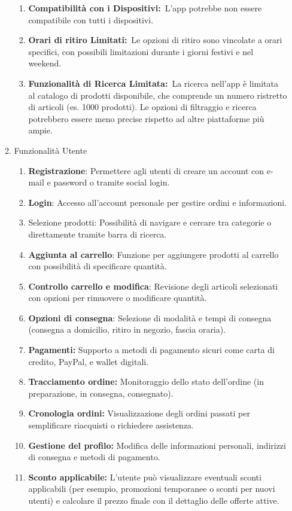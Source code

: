 \documentclass[a4paper,12pt]{article}
\begin{document}
\begin{enumerate}
\begin{enumerate}
\begin{enumerate}
   \item \textbf{Compatibilità con i Dispositivi:} L'app potrebbe non essere compatibile con tutti i dispositivi. 
   
   \item \textbf{Orari di ritiro Limitati:} Le opzioni di ritiro sono vincolate a orari specifici, con possibili limitazioni durante i giorni festivi e nel weekend.
   
   \item \textbf{Funzionalità di Ricerca Limitata:} La ricerca nell'app è limitata al catalogo di prodotti disponibile, che comprende un numero ristretto di articoli (es. 1000 prodotti). Le opzioni di filtraggio e ricerca potrebbero essere meno precise rispetto ad altre piattaforme più ampie. 
   \end{enumerate}
   
   \item{Funzionalità Utente}
   
       \begin{enumerate}
       \item  \textbf{Registrazione}: Permettere agli utenti di creare un account con e-mail e password o tramite social login.
       \item \textbf{Login}: Accesso all’account personale per gestire ordini e informazioni.
       \item Selezione prodotti: Possibilità di navigare e cercare tra categorie o direttamente tramite barra di ricerca.
       \item \textbf{Aggiunta al carrello}: Funzione per aggiungere prodotti al carrello con possibilità di specificare quantità.
       \item \textbf{Controllo carrello e modifica}: Revisione degli articoli selezionati con opzioni per rimuovere o modificare quantità.
       \item \textbf{Opzioni di consegna}: Selezione di modalità e tempi di consegna (consegna a domicilio, ritiro in negozio, fascia oraria).
       \item \textbf{Pagamenti:} Supporto a metodi di pagamento sicuri come carta di credito, PayPal, e wallet digitali.
       \item \textbf{Tracciamento ordine:} Monitoraggio dello stato dell’ordine (in preparazione, in consegna, consegnato).
       \item \textbf{Cronologia ordini:} Visualizzazione degli ordini passati per semplificare riacquisti o richiedere assistenza.
       \item \textbf{Gestione del profilo:} Modifica delle informazioni personali, indirizzi di consegna e metodi di pagamento.
       \item \textbf{Sconto applicabile:} L'utente può visualizzare eventuali sconti applicabili (per esempio, promozioni temporanee o sconti per nuovi utenti) e calcolare il prezzo finale con il dettaglio delle offerte attive.
       \end{enumerate}
   

\end{enumerate}
\end{enumerate}
\end{document}
